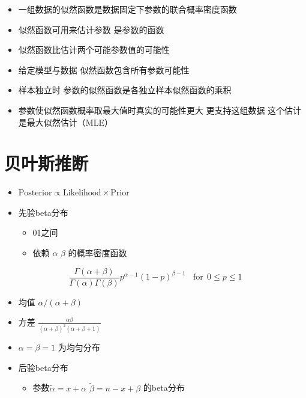 \documentclass[
]{book}
\providecommand{\tightlist}{%
  \setlength{\itemsep}{0pt}\setlength{\parskip}{0pt}}
\begin{document}
\begin{itemize}
\tightlist
\item
  一组数据的似然函数是数据固定下参数的联合概率密度函数
\item
  似然函数可用来估计参数 是参数的函数
\item
  似然函数比估计两个可能参数值的可能性
\item
  给定模型与数据 似然函数包含所有参数可能性
\item
  样本独立时 参数的似然函数是各独立样本似然函数的乘积
\item
  参数使似然函数概率取最大值时真实的可能性更大 更支持这组数据 这个估计是最大似然估计（MLE）
\end{itemize}

\hypertarget{ux8d1dux53f6ux65afux63a8ux65ad}{%
\section{贝叶斯推断}\label{ux8d1dux53f6ux65afux63a8ux65ad}}

\begin{itemize}
\tightlist
\item
  \(\mbox{Posterior} \propto \mbox{Likelihood} \times \mbox{Prior}\)
\item
  先验beta分布

  \begin{itemize}
  \tightlist
  \item
    01之间
  \item
    依赖 \(\alpha\) \(\beta\) 的概率密度函数
  \end{itemize}
\end{itemize}

\[
\frac{\Gamma(\alpha +  \beta)}{\Gamma(\alpha)\Gamma(\beta)}
 p ^ {\alpha - 1} (1 - p) ^ {\beta - 1} ~~~~\mbox{for} ~~ 0 \leq p \leq 1
\]

\begin{itemize}
\tightlist
\item
  均值 \(\alpha / (\alpha + \beta)\)
\item
  方差 \(\frac{\alpha \beta}{(\alpha + \beta)^2 (\alpha + \beta + 1)}\)
\item
  \(\alpha = \beta = 1\) 为均匀分布
\item
  后验beta分布

  \begin{itemize}
  \tightlist
  \item
    参数\(\tilde \alpha = x + \alpha\) \(\tilde \beta = n - x + \beta\) 的beta分布
  \end{itemize}
\end{itemize}
\end{document}
